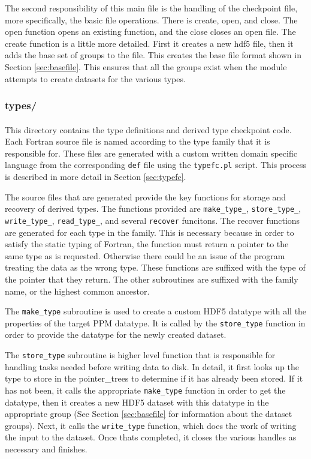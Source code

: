 \documentclass{article}
\begin{document}
The second responsibility of this main file is the handling of the checkpoint file, more specifically, the basic file operations. There is create, open, and close. The open function opens an existing function, and the close closes an open file. The create function is a little more detailed. First it creates a new hdf5 file, then it adds the base set of groups to the file. This creates the base file format shown in Section \ref{sec:basefile}. This ensures that all the groups exist when the module attempts to create datasets for the various types.

\subsubsection{types/}
\label{sec:dirtypes}
\paragraph{}
This directory contains the type definitions and derived type checkpoint code. Each Fortran source file is named according to the type family that it is responsible for. These files are generated with a custom written domain specific language from the corresponding \texttt{def} file using the \texttt{typefc.pl} script. This process is described in more detail in Section \ref{sec:typefc}.

The source files that are generated provide the key functions for storage and recovery of derived types. The functions provided are \texttt{make\_type\_}, \texttt{store\_type\_}, \texttt{write\_type\_}, \texttt{read\_type\_}, and several \texttt{recover} funcitons. The recover functions are generated for each type in the family. This is necessary because in order to satisfy the static typing of Fortran, the function must return a pointer to the same type as is requested. Otherwise there could be an issue of the program treating the data as the wrong type. These functions are suffixed with the type of the pointer that they return. The other subroutines are suffixed with the family name, or the highest common ancestor.

The \texttt{make\_type} subroutine is used to create a custom HDF5 datatype with all the properties of the target PPM datatype. It is called by the \texttt{store\_type} function in order to provide the datatype for the newly created dataset.

The \texttt{store\_type} subroutine is higher level function that is responsible for handling tasks needed before writing data to disk. In detail, it first looks up the type to store in the pointer\_trees to determine if it has already been stored. If it has not been, it calls the appropriate \texttt{make\_type} function in order to get the datatype, then it creates a new HDF5 dataset with this datatype in the appropriate group (See Section \ref{sec:basefile} for information about the dataset groups). Next, it calls the \texttt{write\_type} function, which does the work of writing the input to the dataset. Once thats completed, it closes the various handles as necessary and finishes.
\end{document}
